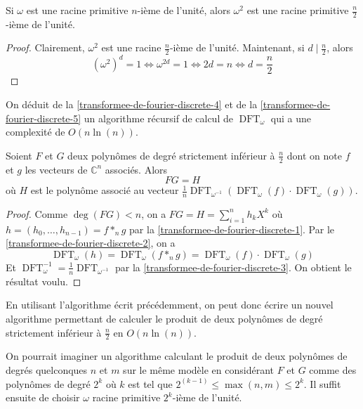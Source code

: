   \begin{proposition}
    \label{transformee-de-fourier-discrete-5}
    Si $\omega$ est une racine primitive $n$-ième de l'unité, alors $\omega^2$ est une racine primitive $\frac{n}{2}$-ième de l'unité.
  \end{proposition}

  \begin{proof}
    Clairement, $\omega^2$ est une racine $\frac{n}{2}$-ième de l'unité. Maintenant, si $d \mid \frac{n}{2}$, alors
    \[ (\omega^2)^d = 1 \iff \omega^{2d} = 1 \iff 2d = n \iff d = \frac{n}{2} \]
  \end{proof}

  On déduit de la \cref{transformee-de-fourier-discrete-4} et de la \cref{transformee-de-fourier-discrete-5} un algorithme récursif de calcul de $\operatorname{DFT}_\omega$ qui a une complexité de $O(n \ln(n))$.


  \begin{theorem}
    Soient $F$ et $G$ deux polynômes de degré strictement inférieur à $\frac{n}{2}$ dont on note $f$ et $g$ les vecteurs de $\mathbb{C}^n$ associés. Alors
    \[ FG = H \]
    où $H$ est le polynôme associé au vecteur $\frac{1}{n} \operatorname{DFT}_{\omega^{-1}} (\operatorname{DFT}_\omega(f) \cdot \operatorname{DFT}_\omega(g))$.
  \end{theorem}

  \begin{proof}
    Comme $\deg(FG) < n$, on a $FG = H = \sum_{i=1}^n h_k X^k$ où $h = (h_0, \dots, h_{n-1}) = f *_n g$ par la \cref{transformee-de-fourier-discrete-1}. Par le \cref{transformee-de-fourier-discrete-2}, on a
    \[ \operatorname{DFT}_\omega (h) = \operatorname{DFT}_\omega(f *_n g) = \operatorname{DFT}_\omega(f) \cdot \operatorname{DFT}_\omega(g) \]
    Et $\operatorname{DFT}_\omega^{-1} = \frac{1}{n} \operatorname{DFT}_{\omega^{-1}}$ par la \cref{transformee-de-fourier-discrete-3}. On obtient le résultat voulu.
  \end{proof}

  En utilisant l'algorithme écrit précédemment, on peut donc écrire un nouvel algorithme permettant de calculer le produit de deux polynômes de degré strictement inférieur à $\frac{n}{2}$ en $O(n \ln(n))$.


  \begin{remark}
    On pourrait imaginer un algorithme calculant le produit de deux polynômes de degrés quelconques $n$ et $m$ sur le même modèle en considérant $F$ et $G$ comme des polynômes de degré $2^k$ où $k$ est tel que $2^{(k-1)} \leq
    \max(n, m) \leq 2^k$. Il suffit ensuite de choisir $\omega$ racine primitive $2^k$-ième de l'unité.
  \end{remark}

